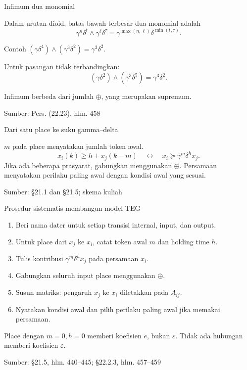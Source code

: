 \documentclass[aspectratio=169,11pt]{beamer}
\newcommand{\source}[1]{%
    \vfill
    \hfill{\tiny\color{gray}Sumber: #1}
}
\newcommand{\eps}{\varepsilon}
\begin{document}
\begin{frame}{Infimum dua monomial}

Dalam urutan dioid, batas bawah terbesar dua monomial adalah
\[
\gamma^n\delta^t\wedge\gamma^\ell\delta^\tau
=\gamma^{\max(n,\ell)}\delta^{\min(t,\tau)}.
\]
\begin{exampleblock}{Contoh}
$(\gamma\delta^4)\wedge(\gamma^3\delta^2)=\gamma^3\delta^2$.\par\medskip
Untuk pasangan tidak terbandingkan:
\[
(\gamma\delta^2)\wedge(\gamma^3\delta^5)=\gamma^3\delta^2.
\]
\end{exampleblock}
Infimum berbeda dari jumlah $\oplus$, yang merupakan supremum.

\source{Pers. (22.23), hlm. 458}
\end{frame}
\begin{frame}{Dari satu place ke suku gamma--delta}


\begin{center}\end{center}
$m$ pada place menyatakan jumlah token awal.
\[
x_i(k)\ge h+x_j(k-m)
\quad\longleftrightarrow\quad
x_i\succeq\gamma^m\delta^h x_j.
\]
Jika ada beberapa prasyarat, gabungkan menggunakan $\oplus$.
Persamaan menyatakan perilaku paling awal dengan kondisi awal yang sesuai.

\source{\S21.1 dan \S21.5; skema kuliah}

\end{frame}
\begin{frame}{Prosedur sistematis membangun model TEG}

\begin{enumerate}
\item Beri nama dater untuk setiap transisi internal, input, dan output.
\item Untuk place dari $x_j$ ke $x_i$, catat token awal $m$ dan holding time $h$.
\item Tulis kontribusi $\gamma^m\delta^h x_j$ pada persamaan $x_i$.
\item Gabungkan seluruh input place menggunakan $\oplus$.
\item Susun matriks: pengaruh $x_j$ ke $x_i$ diletakkan pada $A_{ij}$.
\item Nyatakan kondisi awal dan pilih perilaku paling awal jika memakai persamaan.
\end{enumerate}
Place dengan $m=0,h=0$ memberi koefisien $e$, bukan $\eps$.
Tidak ada hubungan memberi koefisien $\eps$.

\source{\S21.5, hlm. 440--445; \S22.2.3, hlm. 457--459}
\end{frame}
\end{document}
